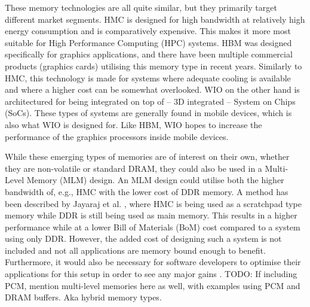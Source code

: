 These memory technologies are all quite similar, but they primarily target different market segments. HMC is designed for high bandwidth at relatively high energy consumption and is comparatively expensive. This makes it more most suitable for High Performance Computing (HPC) systems. HBM was designed specifically for graphics applications, and there have been multiple commercial products (graphics cards) utilising this memory type in recent years. Similarly to HMC, this technology is made for systems where adequate cooling is available and where a higher cost can be somewhat overlooked. WIO on the other hand is architectured for being integrated on top of -- 3D integrated -- System on Chips (SoCs). These types of systems are generally found in mobile devices, which is also what WIO is designed for. Like HBM, WIO hopes to increase the performance of the graphics processors inside mobile devices. 
\bigskip

While these emerging types of memories are of interest on their own, whether they are non-volatile or standard DRAM, they could also be used in a Multi-Level Memory (MLM) design. An MLM design could utilise both the higher bandwidth of, e.g., HMC with the lower cost of DDR memory. A method has been described by Jayaraj et al. \cite{Jayaraj:2015:PPM:2818950.2818976}, where HMC is being used as a scratchpad type memory while DDR is still being used as main memory. This results in a higher performance while at a lower Bill of Materials (BoM) cost compared to a system using only DDR. However, the added cost of designing such a system is not included and not all applications are memory bound enough to benefit. Furthermore, it would also be necessary for software developers to optimise their applications for this setup in order to see any major gains \cite{Bender:2015:KCT:2818950.2818977}\cite{BENDER2017213}. TODO: If including PCM, mention multi-level memories here as well, with examples using PCM and DRAM buffers. Aka hybrid memory types.
\bigskip

